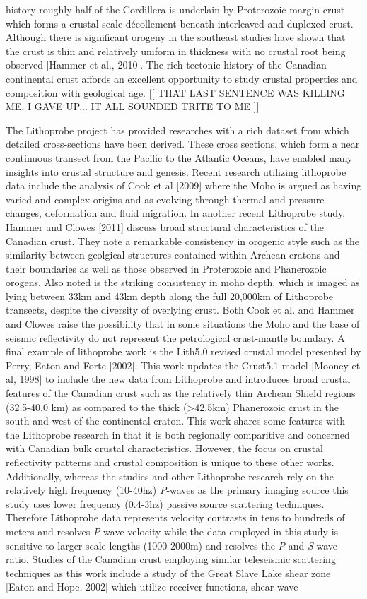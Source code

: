 \documentclass[draft, 12pt]{article}
\begin{document}
history roughly half of the Cordillera is underlain by Proterozoic-margin crust which forms a crustal-scale décollement beneath interleaved and duplexed crust. Although there is significant orogeny in the southeast studies have shown that the crust is thin and relatively uniform in thickness with no crustal root being observed [Hammer et al., 2010]. The rich tectonic history of the Canadian continental crust affords an excellent opportunity to study crustal properties and composition with geological age. [[ THAT LAST SENTENCE WAS KILLING ME, I GAVE UP... IT ALL SOUNDED TRITE TO ME ]]

The Lithoprobe project has provided researches with a rich dataset from which detailed cross-sections have been derived. These cross sections, which form a near continuous transect from the Pacific to the Atlantic Oceans, have enabled many insights into crustal structure and genesis. Recent research utilizing lithoprobe data include the analysis of Cook et al [2009] where the Moho is argued as having varied and complex origins and as evolving through thermal and pressure changes, deformation and fluid migration. In another recent Lithoprobe study, Hammer and Clowes [2011] discuss broad structural characteristics of the Canadian crust. They note a remarkable consistency in orogenic style such as the similarity between geolgical structures contained within Archean cratons and their boundaries as well as those observed in Proterozoic and Phanerozoic orogens. Also noted is the striking consistency in moho depth, which is imaged as lying between 33km and 43km depth along the full 20,000km of Lithoprobe transects, despite the diversity of overlying crust. Both Cook et al. and Hammer and Clowes raise the possibility that in some situations the Moho and the base of seismic reflectivity do not represent the petrological crust-mantle boundary. A final example of lithoprobe work is the Lith5.0 revised crustal model presented by Perry, Eaton and Forte [2002]. This work updates the Crust5.1 model [Mooney et al, 1998] to include the new data from Lithoprobe and introduces broad crustal features of the Canadian crust such as the relatively thin Archean Shield regions (32.5-40.0 km) as compared to the thick (>42.5km) Phanerozoic crust in the south and west of the continental craton. This work shares some features with the Lithoprobe research in that it is both regionally comparitive and concerned with Canadian bulk crustal characteristics. However, the focus on crustal reflectivity patterns and crustal composition is unique to these other works. Additionally, whereas the studies and other Lithoprobe research rely on the relatively high frequency (10-40hz) {\it P}-waves as the primary imaging source this study uses lower frequency (0.4-3hz) passive source scattering techniques. Therefore Lithoprobe data represents velocity contrasts in tens to hundreds of meters and resolves {\it P}-wave velocity while the data employed in this study is sensitive to larger scale lengths (1000-2000m) and resolves the {\it P} and {\it S} wave ratio. Studies of the Canadian crust employing similar teleseismic scattering techniques as this work include a study of the Great Slave Lake shear zone [Eaton and Hope, 2002] which utilize receiver functions, shear-wave 
\end{document}
